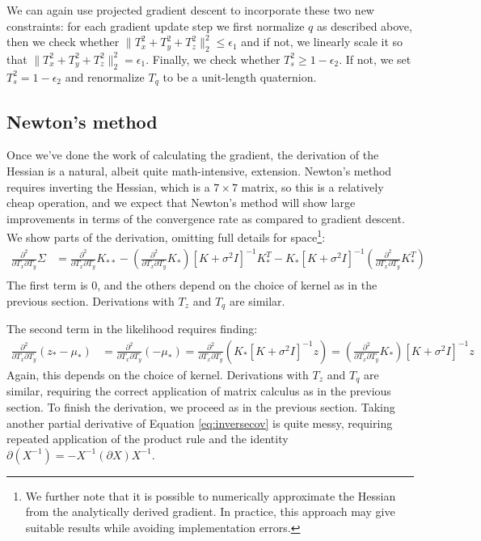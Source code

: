 \documentclass{article} %
\begin{document}
We can again use projected gradient descent to incorporate these two new constraints: for each gradient update step we first normalize $q$ as described above, then we check whether $\|T_x^2 + T_y^2 + T_z^2\|^2_2 \leq \epsilon_1$ and if not, we linearly scale it so that $\|T_x^2 + T_y^2 + T_z^2\|^2_2 = \epsilon_1$. Finally, we check whether $T_s^2 \geq 1-\epsilon_2$. If not, we set $T_s^2 = 1-\epsilon_2$ and renormalize $T_q$ to be a unit-length quaternion. 

\subsection{Newton's method}
\label{sec:newton}
Once we've done the work of calculating the gradient, the derivation of the Hessian is a natural, albeit quite math-intensive, extension. Newton's method requires inverting the Hessian, which is a $7 \times 7$ matrix, so this is a relatively cheap operation, and we expect that Newton's method will show large improvements in terms of the convergence rate as compared to gradient descent. We show parts of the derivation, omitting full details for space\footnote{We further note that it is possible to numerically approximate the Hessian from the analytically derived gradient. In practice, this approach may give suitable results while avoiding implementation errors.}:
\begin{align*}
\frac{\partial^2 }{\partial T_x \partial T_y} \Sigma &= \frac{\partial^2}{\partial T_x \partial T_y} K_{**} - \left(\frac{\partial^2}{\partial T_x \partial T_y}K_{*}\right) [K + \sigma^2 I]^{-1} K_*^T - K_{*} [K + \sigma^2 I]^{-1} \left(\frac{\partial^2}{\partial T_x \partial T_y} K_*^T\right) \\
\end{align*}
The first term is 0, and the others depend on the choice of kernel as in the previous section. Derivations with $T_z$ and $T_q$ are similar.

The second term in the likelihood requires finding:
\begin{align*}
\frac{\partial^2 }{\partial T_x \partial T_y} (z_* - \mu_*) &= \frac{\partial^2 }{\partial T_x \partial T_y} (- \mu_*) 
= \frac{\partial^2 }{\partial T_x \partial T_y}( K_* [K+\sigma^2 I]^{-1} z)
= (\frac{\partial^2 }{\partial T_x \partial T_y} K_*) [K+\sigma^2 I]^{-1} z
\end{align*}
Again, this depends on the choice of kernel. Derivations with $T_z$ and $T_q$ are similar, requiring the correct application of matrix calculus as in the previous section. To finish the derivation, we proceed as in the previous section. Taking another partial derivative of Equation \ref{eq:inversecov} is quite messy, requiring repeated application of the product rule and the identity  $\partial(X^{-1}) = - X^{-1} (\partial X) X^{-1}$.
\end{document}
